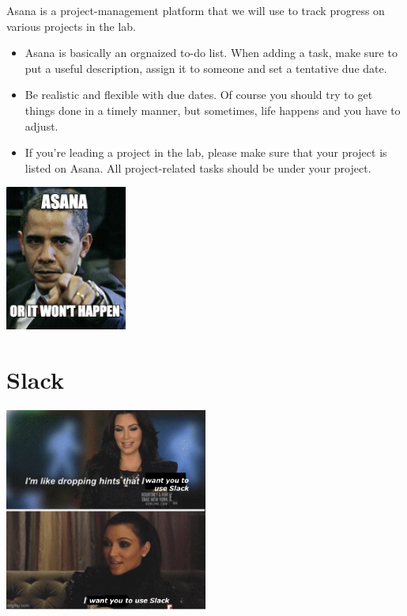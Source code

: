 \documentclass[]{book}
\providecommand{\tightlist}{%
  \setlength{\itemsep}{0pt}\setlength{\parskip}{0pt}}
\begin{document}
Asana is a project-management platform that we will use to track progress on various projects in the lab.

\begin{itemize}
\tightlist
\item
  Asana is basically an orgnaized to-do list. When adding a task, make sure to put a useful description, assign it to someone and set a tentative due date.\\
\item
  Be realistic and flexible with due dates. Of course you should try to get things done in a timely manner, but sometimes, life happens and you have to adjust.\\
\item
  If you're leading a project in the lab, please make sure that your project is listed on Asana. All project-related tasks should be under your project.
\end{itemize}

\includegraphics[width=0.3\textwidth,height=\textheight]{images/asana.jpg}

\hypertarget{slack}{%
\section{Slack}\label{slack}}

\includegraphics[width=0.5\textwidth,height=\textheight]{images/dropping_hints_slack.jpg}
\end{document}
